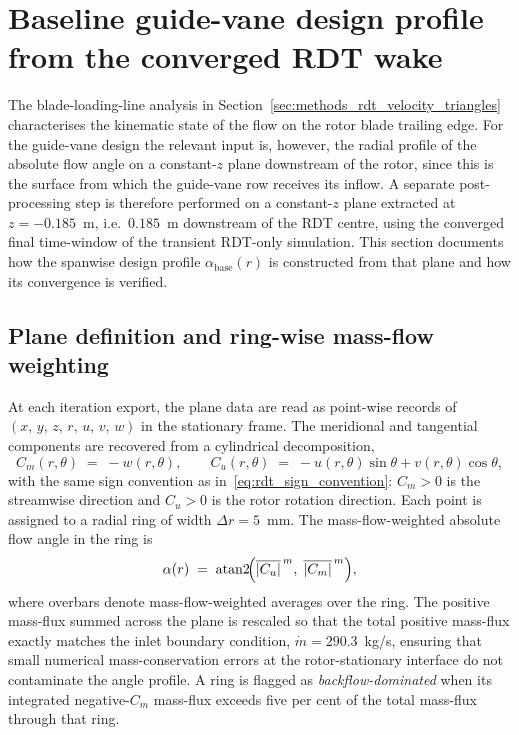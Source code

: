 \section{Baseline guide-vane design profile from the converged RDT wake}
\label{sec:methods_rdt_baseline_alpha}
 
The blade-loading-line analysis in
Section~\ref{sec:methods_rdt_velocity_triangles} characterises the
kinematic state of the flow on the rotor blade trailing edge. For the
guide-vane design the relevant input is, however, the radial profile of
the absolute flow angle on a constant-$z$ plane downstream of the rotor,
since this is the surface from which the guide-vane row receives its
inflow. A separate post-processing step is therefore performed on a
constant-$z$ plane extracted at $z=-0.185$~m, i.e.\ $0.185$~m downstream
of the RDT centre, using the converged final time-window of the
transient RDT-only simulation. This section documents how the spanwise
design profile $\alpha_{\mathrm{base}}(r)$ is constructed from that
plane and how its convergence is verified.
 
\subsection{Plane definition and ring-wise mass-flow weighting}
 
At each iteration export, the plane data are read as point-wise records
of $(x,\,y,\,z,\,r,\,u,\,v,\,w)$ in the stationary frame. The
meridional and tangential components are recovered from a cylindrical
decomposition,
%
\begin{equation}
C_m(r,\theta) \;=\; -w(r,\theta), \qquad
C_u(r,\theta) \;=\; -u(r,\theta)\sin\theta + v(r,\theta)\cos\theta,
\label{eq:plane_decomposition}
\end{equation}
%
with the same sign convention as in~\eqref{eq:rdt_sign_convention}:
$C_m>0$ is the streamwise direction and $C_u>0$ is the rotor rotation
direction. Each point is assigned to a radial ring of width
$\Delta r = 5$~mm. The mass-flow-weighted absolute flow angle in the
ring is
%
\begin{equation}
\alpha(r) \;=\; \mathrm{atan2}\!\Bigl(\overline{|C_u|}^{\,m},\;
                                      \overline{|C_m|}^{\,m}\Bigr),
\label{eq:alpha_ring_mflow}
\end{equation}
%
where overbars denote mass-flow-weighted averages over the ring. The
positive mass-flux summed across the plane is rescaled so that the
total positive mass-flux exactly matches the inlet boundary condition,
$\dot m = 290.3$~kg/s, ensuring that small numerical mass-conservation
errors at the rotor-stationary interface do not contaminate the angle
profile. A ring is flagged as \emph{backflow-dominated} when its
integrated negative-$C_m$ mass-flux exceeds five per cent of the total
mass-flux through that ring.
 
